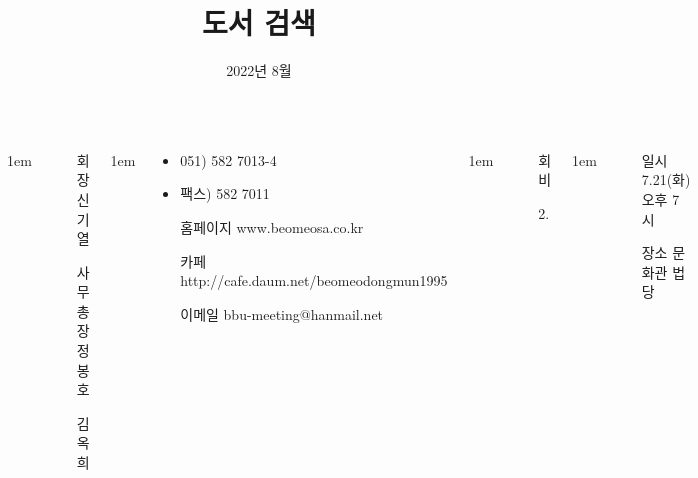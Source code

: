 \documentclass[	20pt, 
							a1paper, 
							portrait, %
							margin=0mm, %
							innermargin=10mm,  		%
							colspace=5mm, 
							subcolspace=0mm
							]{tikzposter}
\title{도서 검색}
\author{ 2022년 8월 }
\begin{document}
	\maketitle

	\begin{columns}


			{
					\setlength{\leftmargini}{7em}
					\setlength{\labelsep} {1em}
				\begin{LARGE}
					\begin{itemize}
					\item [회장] 신기열
					\item [사무총장]정봉호
					\item [] 김옥희
					\end{itemize}
				\end{LARGE}
			}

			{
					\setlength{\leftmargini}{7em}
					\setlength{\labelsep} {1em}
				\begin{LARGE}
					\begin{itemize}
					\item 051) 582 7013-4
					\item 팩스) 582 7011
					\item [홈페이지] www.beomeosa.co.kr
					\item [카페] 	http://cafe.daum.net/beomeodongmun1995
					\item [이메일] 	bbu-meeting@hanmail.net

					\end{itemize}
				\end{LARGE}
			}


			{
					\setlength{\leftmargini}{4em}
					\setlength{\labelsep} {1em}
				\begin{LARGE}
					\begin{itemize}
					\item [회비]
					\item [2.] 
					\end{itemize}
				\end{LARGE}
			}



			{
					\setlength{\leftmargini}{4em}
					\setlength{\labelsep} {1em}
				\begin{LARGE}
					\begin{itemize}
					\item [일시] 7.21(화) 오후 7시
					\item [장소] 문화관 법당
					\end{itemize}
				\end{LARGE}
			}






\end{columns}
\end{document}
